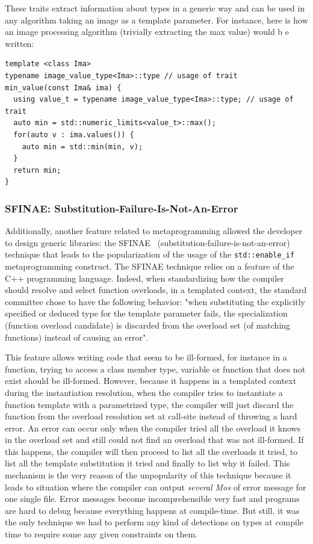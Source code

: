 These traits extract information about types in a generic way and can be used in any algorithm taking an image as a
template parameter. For instance, here is how an image processing algorithm (trivially extracting the max value) would b
e written:

\begin{verbatim}
template <class Ima>
typename image_value_type<Ima>::type // usage of trait
min_value(const Ima& ima) {
  using value_t = typename image_value_type<Ima>::type; // usage of trait
  auto min = std::numeric_limits<value_t>::max();
  for(auto v : ima.values()) {
    auto min = std::min(min, v);
  }
  return min;
}
\end{verbatim}

\subsubsection{SFINAE: Substitution-Failure-Is-Not-An-Error}
\label{subsec:sfinae}

Additionally, another feature related to metaprogramming  allowed the developer to design generic libraries: the
SFINAE~\parencite{vandevoorde.2002.c++} (substitution-failure-is-not-an-error) technique that leads to the
popularization of the usage of the \texttt{std::enable\_if} metaprogramming construct. The SFINAE technique relies on a
feature of the C++ programming language. Indeed, when standardizing how the compiler should resolve and select function
overloads, in a templated context, the standard committee chose to have the following behavior: "when substituting the
explicitly specified or deduced type for the template parameter fails, the specialization (function overload candidate)
is discarded from the overload set (of matching functions) instead of causing an error".

This feature allows writing code that seem to be ill-formed, for instance in a function, trying to access a class member
type, variable or function that does not exist should be ill-formed. However, because it happens in a templated context
during the instantiation resolution, when the compiler tries to instantiate a function template with a parametrized
type, the compiler will just discard the function from the overload resolution set at call-site instead of throwing a
hard error. An error can occur only when the compiler tried all the overload it knows in the overload set and still
could not find an overload that was not ill-formed. If this happens, the compiler will then proceed to list all the
overloads it tried, to list all the template substitution it tried and finally to list why it failed. This mechanism is
the very reason of the unpopularity of this technique because it leads to situation where the compiler can output
\emph{several Mos} of error message for one single file. Error messages become incomprehensible very fast and programs
are hard to debug because everything happens at compile-time. But still, it was the only technique we had to perform any
kind of detections on types at compile time to require some any given constraints on them.

